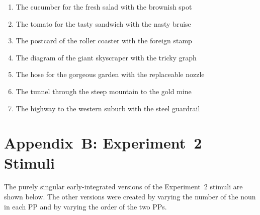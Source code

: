 \documentclass[12pt,titlepage]{article}
\begin{document}
\begin{enumerate}
\item The cucumber for the fresh salad with the brownish spot
    
\item The tomato for the tasty sandwich with the nasty bruise
    
\item The postcard of the roller coaster with the foreign stamp
    
\item The diagram of the giant skyscraper with the tricky graph
    
\item The hose for the gorgeous garden with the replaceable nozzle
    
\item The tunnel through the steep mountain to the gold mine
    
\item The highway to the western suburb with the steel guardrail

\end{enumerate}

\clearpage

\section[Appendix~B]{\center Appendix~B: Experiment~2 Stimuli}

The purely singular early-integrated versions of the Experiment~2
stimuli are shown below.  The other versions were created by varying
the number of the noun in each PP and by varying the order of the two
PPs.
\end{document}
